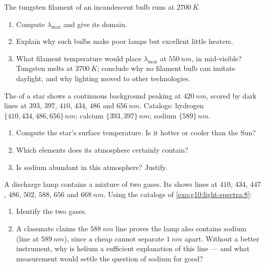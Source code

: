 \begin{exercise}[$\star\star\star$]\label{exo:g10:light-spectra:12}
The tungsten filament of an incandescent bulb runs at $\qty{2700}{K}$.
\begin{enumerate}
  \item Compute $\lambda_{\max}$ and give its domain.
  \item Explain why such bulbs make poor lamps but excellent little
        heaters.
  \item What filament temperature would place $\lambda_{\max}$ at
        $\qty{550}{nm}$, in mid-visible? Tungsten melts at
        $\qty{3700}{K}$; conclude why no filament bulb can imitate
        daylight, and why lighting moved to other technologies.
\end{enumerate}
\end{exercise}

\begin{exercise}[$\star\star\star$]\label{exo:g10:light-spectra:13}
The  of a star shows a continuous background peaking at
$\qty{420}{nm}$, scored by dark lines at $393$, $397$, $410$, $434$,
$486$ and $\qty{656}{nm}$. Catalogs: hydrogen
$\{410, 434, 486, 656\}\,\unit{nm}$; calcium $\{393, 397\}\,\unit{nm}$;
sodium $\{589\}\,\unit{nm}$.
\begin{enumerate}
  \item Compute the star's surface temperature. Is it hotter or cooler
        than the Sun?
  \item Which elements does its atmosphere certainly contain?
  \item Is sodium abundant in this atmosphere? Justify.
\end{enumerate}
\end{exercise}

\begin{exercise}[$\star\star\star$]\label{exo:g10:light-spectra:14}
A discharge lamp contains a mixture of two gases. Its  shows
lines at $410$, $434$, $447$, $486$, $502$, $588$, $656$ and
$\qty{668}{nm}$. Using the catalogs of \cref{exo:g10:light-spectra:8}:
\begin{enumerate}
  \item Identify the two gases.
  \item A classmate claims the $\qty{588}{nm}$ line proves the lamp
        also contains sodium (line at $\qty{589}{nm}$), since a cheap
         cannot separate  $\qty{1}{nm}$ apart.
        Without a better instrument, why is helium a sufficient
        explanation of this line --- and what measurement would settle
        the question of sodium for good?
\end{enumerate}
\end{exercise}


